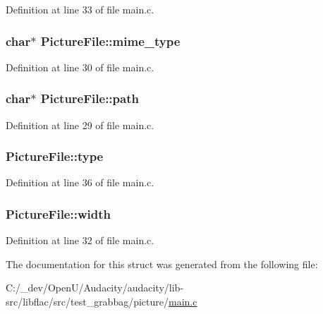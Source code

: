 Definition at line 33 of file main.\+c.

\subsubsection[{\texorpdfstring{mime\+\_\+type}{mime_type}}]{ char$\ast$ Picture\+File\+::mime\+\_\+type}\hypertarget{struct_picture_file_a90610e2bb707c30a88a35283fe4b686c}{}\label{struct_picture_file_a90610e2bb707c30a88a35283fe4b686c}


Definition at line 30 of file main.\+c.

\subsubsection[{\texorpdfstring{path}{path}}]{ char$\ast$ Picture\+File\+::path}\hypertarget{struct_picture_file_ae82230df4f0fbc6bc8b81796f4d6dabc}{}\label{struct_picture_file_ae82230df4f0fbc6bc8b81796f4d6dabc}


Definition at line 29 of file main.\+c.

\subsubsection[{\texorpdfstring{type}{type}}]{ Picture\+File\+::type}\hypertarget{struct_picture_file_a2b2b97245e40b05a9173cffd7985a4f5}{}\label{struct_picture_file_a2b2b97245e40b05a9173cffd7985a4f5}


Definition at line 36 of file main.\+c.

\subsubsection[{\texorpdfstring{width}{width}}]{ Picture\+File\+::width}\hypertarget{struct_picture_file_ade47cebcf68a6d719588f7607d11d607}{}\label{struct_picture_file_ade47cebcf68a6d719588f7607d11d607}


Definition at line 32 of file main.\+c.



The documentation for this struct was generated from the following file\+:\begin{DoxyCompactItemize}
\item 
C\+:/\+\_\+dev/\+Open\+U/\+Audacity/audacity/lib-\/src/libflac/src/test\+\_\+grabbag/picture/\hyperlink{src_2test__grabbag_2picture_2main_8c}{main.\+c}\end{DoxyCompactItemize}
